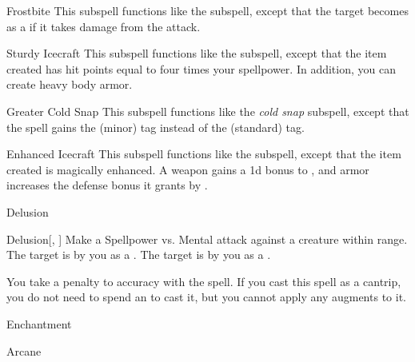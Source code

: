 \begin{ability}[\nth{4}]{Frostbite}
This subspell functions like the  subspell, except that the target becomes  as a  if it takes damage from the attack.
\end{ability}
\vspace{0.25em}


\begin{ability}[\nth{4}]{Sturdy Icecraft}
This subspell functions like the  subspell, except that the item created has hit points equal to four times your spellpower.
In addition, you can create heavy body armor.
\end{ability}
\vspace{0.25em}


\begin{ability}[\nth{5}]{Greater Cold Snap}
This subspell functions like the \textit{cold snap} subspell, except that the spell gains the  (minor) tag instead of the  (standard) tag.
\end{ability}
\vspace{0.25em}


\begin{ability}[\nth{6}]{Enhanced Icecraft}
This subspell functions like the  subspell, except that the item created is magically enhanced.
A weapon gains a \plus1d bonus to , and armor increases the defense bonus it grants by .
\end{ability}
\vspace{0.25em}

\newpage
\begin{spellsection}{Delusion}

\begin{spellheader}
\end{spellheader}


\begin{ability}{Delusion}[, ]
Make a Spellpower vs. Mental attack against a creature within \rngmed range.
\hit The target is \frightened by you as a .
\crit The target is \panicked by you as a .
\end{ability}



You take a  penalty to accuracy with the spell.
If you cast this spell as a cantrip,
you do not need to spend an  to cast it,
but you cannot apply any augments to it.


 Enchantment

 Arcane
\end{spellsection}


